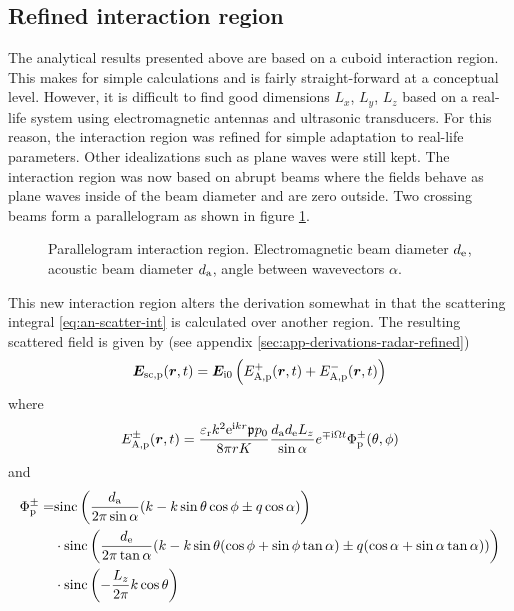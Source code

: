 \documentclass[11pt,twoside]{eitExjobb}
\begin{document}
	\subsection{Refined interaction region} \label{sec:analytical-radar-refined}
	The analytical results presented above are based on a cuboid interaction region. This makes for simple calculations and is fairly straight-forward at a conceptual level. However, it is difficult to find good dimensions $L_x$, $L_y$, $L_z$ based on a real-life system using electromagnetic antennas and ultrasonic transducers. For this reason, the interaction region was refined for simple adaptation to real-life parameters. Other idealizations such as plane waves were still kept. The interaction region was now based on abrupt beams where the fields behave as plane waves inside of the beam diameter and are zero outside. Two crossing beams form a parallelogram as shown in figure \ref{fig:an-parallelogram}.
	\begin{figure}[h]
		\centering
		\resizebox{\textwidth}{!}{
			
		}
		\caption{\label{fig:an-parallelogram} Parallelogram interaction region. Electromagnetic beam diameter $d_{\mathrm{e}}$, acoustic beam diameter $d_{\mathrm{a}}$, angle between wavevectors $\alpha$.}
	\end{figure}
	This new interaction region alters the derivation somewhat in that the scattering integral \eqref{eq:an-scatter-int} is calculated over another region. The resulting scattered field is given by (see appendix \ref{sec:app-derivations-radar-refined})
	\begin{equation*}
	\bm{E}_{\mathrm{sc,p}} (\bm{r},t) = \bm{E}_{\mathrm{i}0} \left( E_{\mathrm{A,p}}^+ (\bm{r},t) + E_{\mathrm{A,p}}^- (\bm{r},t) \right)
	\end{equation*}
	where
	\begin{equation*}
	E_{\mathrm{A,p}}^\pm (\bm{r},t) = \frac{\varepsilon_{\mathrm{r}}k^2 \mathrm{e}^{\mathrm{i} kr} \mathfrak{p} p_0}{8\pi r K} \frac{d_{\mathrm{a}} d_{\mathrm{e}} L_{z}}{\sin{\alpha}} e^{\mp \mathrm{i} \Omega t} \Phi_{\mathrm{p}}^\pm (\theta,\phi)
	\end{equation*}
	and
	\begin{equation*}
	\begin{split}
	\Phi_{\mathrm{p}}^\pm =& \text{sinc}\left( \frac{d_{\mathrm{a}}}{2\pi \sin{\alpha}}(k - k\sin{\theta}\cos{\phi} \pm q\cos{\alpha}) \right) \\
	&\cdot \text{sinc}\left( \frac{d_{\mathrm{e}}}{2\pi \tan{\alpha}}
	(k - k\sin{\theta}(\cos{\phi} + \sin{\phi}\tan{\alpha}) \pm q(\cos{\alpha} + \sin{\alpha}\tan{\alpha})) \right) \\
	&\cdot \text{sinc}\left( -\frac{L_{z}}{2\pi} k\cos{\theta} \right)
	\end{split}
	\end{equation*}
\end{document}
